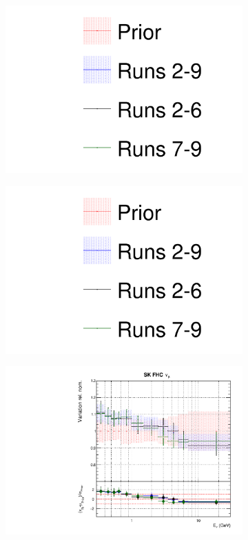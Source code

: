 \begin{figure}
\centering
\begin{subfigure}{0.3\textwidth}
  \centering
  \includegraphics[width=1.0\linewidth, trim={5mm  90mm 0mm 0mm}, clip]{figs/newolddatafits_leg}
\end{subfigure}
\begin{subfigure}{0.3\textwidth}
  \centering
  \includegraphics[width=1.0\linewidth, trim={5mm  0mm 0mm 95mm}, clip]{figs/newolddatafits_leg}
\end{subfigure}
\begin{subfigure}{0.45\textwidth}
  \centering
  \includegraphics[width=0.75\linewidth]{figs/newolddatafitsflux_8}

\end{subfigure}
\end{figure}
